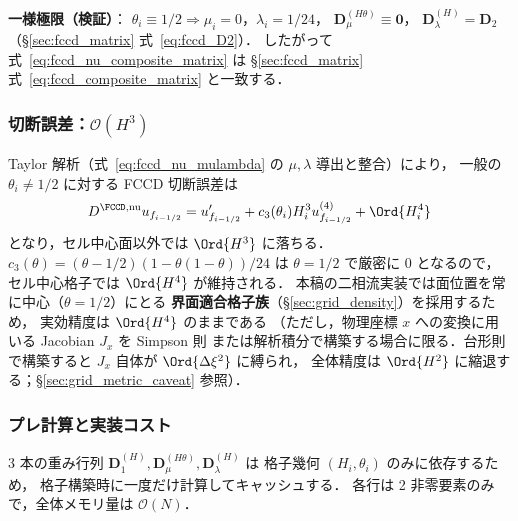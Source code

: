 \noindent\textbf{一様極限（検証）}：
$\theta_i \equiv 1/2 \Rightarrow \mu_i = 0$，$\lambda_i = 1/24$，
$\mathbf{D}_\mu^{(H\theta)} \equiv \mathbf{0}$，
$\mathbf{D}_\lambda^{(H)} = \mathbf{D}_2$（\S\ref{sec:fccd_matrix} 式~\eqref{eq:fccd_D2}）．
したがって式~\eqref{eq:fccd_nu_composite_matrix} は
\S\ref{sec:fccd_matrix} 式~\eqref{eq:fccd_composite_matrix} と一致する．

\subsubsection{切断誤差：\texorpdfstring{$\mathcal{O}(H^3)$}{O(H3)}}
\label{sec:fccd_nu_truncation}

Taylor 解析（式~\eqref{eq:fccd_nu_mulambda} の $\mu,\lambda$ 導出と整合）により，
一般の $\theta_i \neq 1/2$ に対する FCCD 切断誤差は
\begin{equation}
  D^{\FCCD,\text{nu}} u_{f_{i-1/2}}
  = u'_{f_{i-1/2}} + c_3(\theta_i) H_i^3 u^{(4)}_{f_{i-1/2}} + \Ord{H_i^4}
  \label{eq:fccd_nu_truncation}
\end{equation}
となり，セル中心面以外では $\Ord{H^3}$ に落ちる．
$c_3(\theta) = (\theta-1/2)(1-\theta(1-\theta))/24$ は
$\theta = 1/2$ で厳密に $0$ となるので，
セル中心格子では $\Ord{H^4}$ が維持される．
本稿の二相流実装では面位置を常に中心（$\theta = 1/2$）にとる
\textbf{界面適合格子族}（\S\ref{sec:grid_density}）を採用するため，
実効精度は $\Ord{H^4}$ のままである
（ただし，物理座標 $x$ への変換に用いる Jacobian $J_x$ を Simpson 則
または解析積分で構築する場合に限る．台形則で構築すると
$J_x$ 自体が $\Ord{\Delta\xi^2}$ に縛られ，
全体精度は $\Ord{H^2}$ に縮退する；§\ref{sec:grid_metric_caveat} 参照）．

\subsubsection{プレ計算と実装コスト}
\label{sec:fccd_nu_precompute}

3 本の重み行列 $\mathbf{D}_1^{(H)}, \mathbf{D}_\mu^{(H\theta)}, \mathbf{D}_\lambda^{(H)}$ は
格子幾何 $(H_i,\theta_i)$ のみに依存するため，
格子構築時に一度だけ計算してキャッシュする．
各行は 2 非零要素のみで，全体メモリ量は $\mathcal{O}(N)$．

